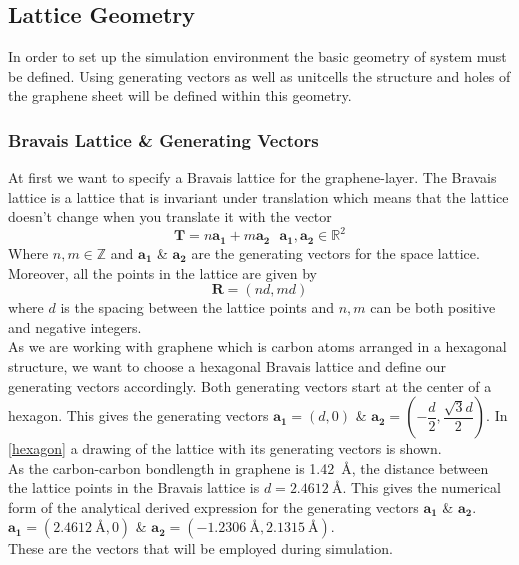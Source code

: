 
\subsection{Lattice Geometry}
In order to set up the simulation environment the basic geometry of system must be defined. Using generating vectors as well as unitcells the structure and holes of the graphene sheet will be defined within this geometry.
\subsubsection{Bravais Lattice \& Generating Vectors}
At first we want to specify a Bravais lattice for the graphene-layer. The Bravais lattice is a lattice that is invariant under translation which means that the lattice doesn't change when you translate it with the vector
\begin{equation}
 \mathbf{T}=n\mathbf{a_{1}}+m\mathbf{a_{2}}\ \ \ \mathbf{a_{1}},\mathbf{a_{2}} \in \mathbb{R}^{2}
\end{equation}
Where $n,m \in \mathbb{Z}$ and $\mathbf{a_{1}}$ \& $\mathbf{a_{2}}$ are the generating vectors for the space lattice. Moreover, all the points in the lattice are given by
\begin{equation}
 \mathbf{R}=(nd,md)
\end{equation}
where $d$ is the spacing between the lattice points and $n,m$ can be both positive and negative integers. \\
As we are working with graphene which is carbon atoms arranged in a hexagonal structure, we want to choose a hexagonal Bravais lattice and define our generating vectors accordingly. Both generating vectors start at the center of a hexagon. This gives the generating vectors $\mathbf{a_{1}}=(d,0)$ \& $\mathbf{a_{2}}=\left(-\dfrac{d}{2},\dfrac{\sqrt{3}d}{2}\right)$. In \cref{hexagon} a drawing of the lattice with its generating vectors is shown.\\
As the carbon-carbon bondlength in graphene is \SI{1.42}{\angstrom}, the distance between the lattice points  in the Bravais lattice is $d=\SI{2.4612}{\angstrom}$. This gives the numerical form of the analytical derived expression for the generating vectors  $\mathbf{a_{1}}$ \& $\mathbf{a_{2}}$. \\
$\mathbf{a_{1}}=(\SI{2.4612}{\angstrom},0)$ \& $\mathbf{a_{2}}=\left(-\SI{1.2306}{\angstrom},\SI{2.1315}{\angstrom}\right)$. \\These are the vectors that will be employed during simulation.
